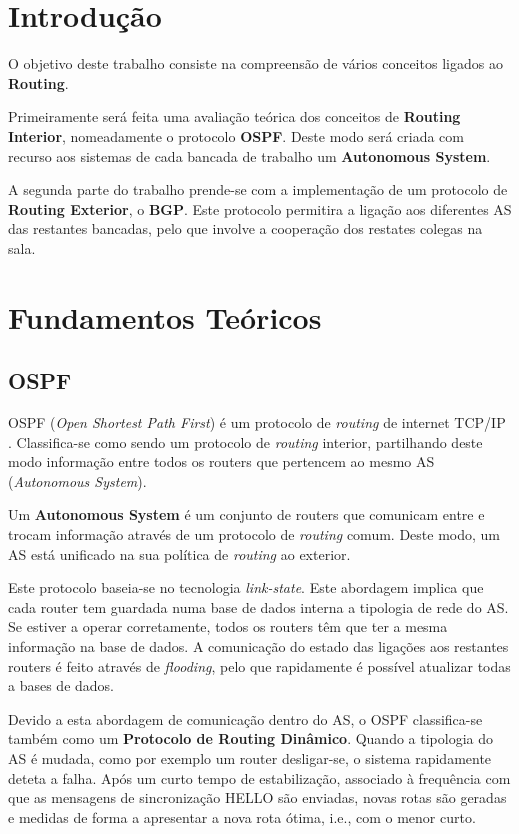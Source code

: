 \chapter{Introdução} \label{sec:intro}

O objetivo deste trabalho consiste na compreensão de vários conceitos ligados ao \textbf{Routing}.

Primeiramente será feita uma avaliação teórica dos conceitos de \textbf{Routing Interior}, nomeadamente o protocolo \textbf{OSPF}.
Deste modo será criada com recurso aos sistemas de cada bancada de trabalho um \textbf{Autonomous System}.

A segunda parte do trabalho prende-se com a implementação de um protocolo de \textbf{Routing Exterior}, o \textbf{BGP}.
Este protocolo permitira a ligação aos diferentes AS das restantes bancadas, pelo que involve a cooperação dos restates colegas na sala.

\chapter{Fundamentos Teóricos} \label{sec:objectives}

\section{OSPF}

OSPF (\textit{Open Shortest Path First}) é um protocolo de \textit{routing} de internet TCP/IP \cite{ospf}.
Classifica-se como sendo um protocolo de \textit{routing} interior, partilhando deste modo informação entre todos os routers que pertencem ao mesmo AS (\textit{Autonomous System}).

Um \textbf{Autonomous System} é um conjunto de routers que comunicam entre e trocam informação através de um protocolo de \textit{routing} comum.
Deste modo, um AS está unificado na sua política de \textit{routing} ao exterior.

Este protocolo baseia-se no tecnologia \textit{link-state}.
Este abordagem implica que cada router tem guardada numa base de dados interna a tipologia de rede do AS.
Se estiver a operar corretamente, todos os routers têm que ter a mesma informação na base de dados.
A comunicação do estado das ligações aos restantes routers é feito através de \textit{flooding}, pelo que rapidamente é possível atualizar todas a bases de dados.

Devido a esta abordagem de comunicação dentro do AS, o OSPF classifica-se também como um \textbf{Protocolo de Routing Dinâmico}.
Quando a tipologia do AS é mudada, como por exemplo um router desligar-se, o sistema rapidamente deteta a falha.
Após um curto tempo de estabilização, associado à frequência com que as mensagens de sincronização HELLO são enviadas,
novas rotas são geradas e medidas de forma a apresentar a nova rota ótima, i.e., com o menor curto.

